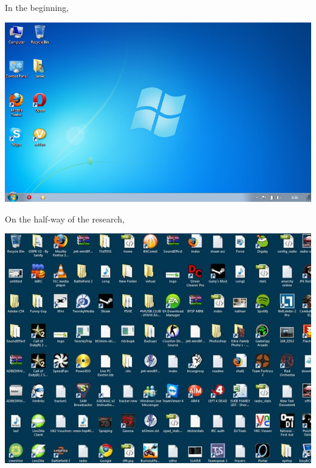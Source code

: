 \begin{frame}{\secname}
In the beginning, 
\begin{center}
		\includegraphics[scale=0.4]{image/desktop}
\end{center}
\end{frame}

\begin{frame}{\secname}
On the half-way of the research, \\
\begin{center}
		\includegraphics[scale=0.5]{image/messy-desktop}
\end{center}
\end{frame}


